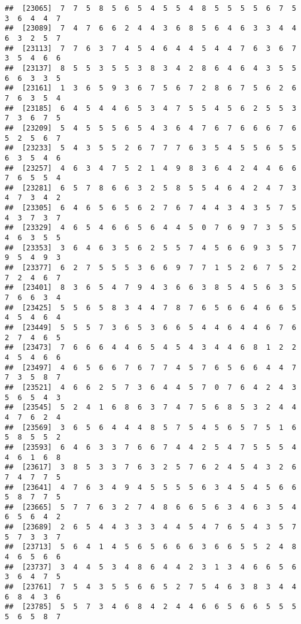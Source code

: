 \documentclass[
]{book}
\begin{document}
\begin{verbatim}
##  [23065]  7  7  5  8  5  6  5  4  5  5  4  8  5  5  5  5  6  7  5  3  6  4  4  7
##  [23089]  7  4  7  6  6  2  4  4  3  6  8  5  6  4  6  3  3  4  4  6  3  2  5  7
##  [23113]  7  7  6  3  7  4  5  4  6  4  4  5  4  4  7  6  3  6  7  3  5  4  6  6
##  [23137]  8  5  5  3  5  5  3  8  3  4  2  8  6  4  6  4  3  5  5  6  6  3  3  5
##  [23161]  1  3  6  5  9  3  6  7  5  6  7  2  8  6  7  5  6  2  6  7  6  3  5  4
##  [23185]  6  4  5  4  4  6  5  3  4  7  5  5  4  5  6  2  5  5  3  7  3  6  7  5
##  [23209]  5  4  5  5  5  6  5  4  3  6  4  7  6  7  6  6  6  7  6  5  2  5  6  7
##  [23233]  5  4  3  5  5  2  6  7  7  7  6  3  5  4  5  5  6  5  5  6  3  5  4  6
##  [23257]  4  6  3  4  7  5  2  1  4  9  8  3  6  4  2  4  4  6  6  7  6  5  5  4
##  [23281]  6  5  7  8  6  6  3  2  5  8  5  5  4  6  4  2  4  7  3  4  7  3  4  2
##  [23305]  6  4  6  5  6  5  6  2  7  6  7  4  4  3  4  3  5  7  5  4  3  7  3  7
##  [23329]  4  6  5  4  6  6  5  6  4  4  5  0  7  6  9  7  3  5  5  4  6  3  5  5
##  [23353]  3  6  4  6  3  5  6  2  5  5  7  4  5  6  6  9  3  5  7  9  5  4  9  3
##  [23377]  6  2  7  5  5  5  3  6  6  9  7  7  1  5  2  6  7  5  2  7  2  4  6  7
##  [23401]  8  3  6  5  4  7  9  4  3  6  6  3  8  5  4  5  6  3  5  7  6  6  3  4
##  [23425]  5  5  6  5  8  3  4  4  7  8  7  6  5  6  6  4  6  6  5  4  5  4  6  4
##  [23449]  5  5  5  7  3  6  5  3  6  6  5  4  4  6  4  4  6  7  6  2  7  4  6  5
##  [23473]  7  6  6  6  4  4  6  5  4  5  4  3  4  4  6  8  1  2  2  4  5  4  6  6
##  [23497]  4  6  5  6  6  7  6  7  7  4  5  7  6  5  6  6  4  4  7  7  3  5  8  7
##  [23521]  4  6  6  2  5  7  3  6  4  4  5  7  0  7  6  4  2  4  3  5  6  5  4  3
##  [23545]  5  2  4  1  6  8  6  3  7  4  7  5  6  8  5  3  2  4  4  4  7  6  2  4
##  [23569]  3  6  5  6  4  4  4  8  5  7  5  4  5  6  5  7  5  1  6  5  8  5  5  2
##  [23593]  6  4  6  3  3  7  6  6  7  4  4  2  5  4  7  5  5  5  4  4  6  1  6  8
##  [23617]  3  8  5  3  3  7  6  3  2  5  7  6  2  4  5  4  3  2  6  7  4  7  7  5
##  [23641]  4  7  6  3  4  9  4  5  5  5  5  6  3  4  5  4  5  6  6  5  8  7  7  5
##  [23665]  5  7  7  6  3  2  7  4  8  6  6  5  6  3  4  6  3  5  4  6  5  6  4  2
##  [23689]  2  6  5  4  4  3  3  3  4  4  5  4  7  6  5  4  3  5  7  5  7  3  3  7
##  [23713]  5  6  4  1  4  5  6  5  6  6  6  3  6  6  5  5  2  4  8  4  6  5  6  6
##  [23737]  3  4  4  5  3  4  8  6  4  4  2  3  1  3  4  6  6  5  6  3  6  4  7  5
##  [23761]  7  5  4  3  5  5  6  6  5  2  7  5  4  6  3  8  3  4  4  6  8  4  3  6
##  [23785]  5  5  7  3  4  6  8  4  2  4  4  6  6  5  6  6  5  5  5  5  6  5  8  7

\end{verbatim}
\end{document}
